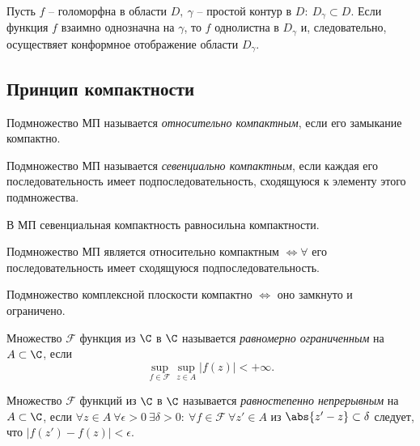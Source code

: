 

\begin{theorem}
	Пусть $f$ -- голоморфна в области $D, \ \gamma $ -- простой контур в $D: \ D_{\gamma } \subset D$. Если функция $f$ взаимно однозначна на $\gamma $, то $f$ однолистна в $D_{\gamma } $ и, следовательно, осуществяет конформное отображение области $D_{\gamma } $.
\end{theorem}

\subsection{Принцип компактности}

\begin{definition}
	Подмножество МП называется \emph{относительно компактным}, если его замыкание компактно.
\end{definition}

\begin{definition}
	Подмножество МП называется \emph{севенциально компактным}, если каждая его последовательность имеет подпоследовательность, сходящуюся к элементу этого подмножества.
\end{definition}

\begin{note}
	В МП севенциальная компактность равносильна компактности.
\end{note}

\begin{lemma}
	Подмножество МП является относительно компактным $\iff \forall $ его последовательность имеет сходящуюся подпоследовательность.
\end{lemma}

\begin{remark}
	Подмножество комплексной плоскости компактно $\iff $ оно замкнуто и ограничено.
\end{remark}

\begin{definition}
	Множество $\mathcal{F}$ функция из $\C$ в $\C$ называется \emph{равномерно ограниченным} на $A \subset \C$, если
	\[
		\underset{f \in \mathcal{F}}{\sup} \underset{z \in A}{\sup} \big|f(z)\big| < +\infty .
	\]
\end{definition}

\begin{definition}
	Множество $\mathcal{F}$ функций из $\C$ в $\C$ называется \emph{равностепенно непрерывным} на $A \subset \C$, если $\forall z \in A \ \forall \epsilon > 0 \ \exists \delta > 0 : \ \forall f \in \mathcal{F} \ \forall z ' \in A$ из $\abs{z ' - z} \subset \delta $ следует, что $\big|f(z ') - f(z)\big| < \epsilon $.
\end{definition}

